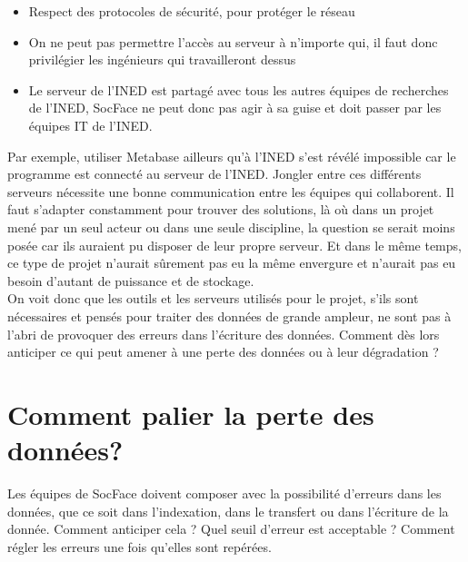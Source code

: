 \begin{itemize}
    \item Respect des protocoles de sécurité, pour protéger le réseau
    \item On ne peut pas permettre l’accès au serveur à n’importe qui, il faut donc privilégier les ingénieurs qui travailleront dessus
    \item Le serveur de l’INED est partagé avec tous les autres équipes de recherches de l’INED, SocFace ne peut donc pas agir à sa guise et doit passer par les équipes IT de l’INED.
\end{itemize}

Par exemple, utiliser Metabase ailleurs qu’à l’INED s’est révélé impossible car le programme est connecté au serveur de l’INED. Jongler entre ces différents serveurs nécessite une bonne communication entre les équipes qui collaborent. Il faut s’adapter constamment pour trouver des solutions, là où dans un projet mené par un seul acteur ou dans une seule discipline, la question se serait moins posée car ils auraient pu disposer de leur propre serveur. Et dans le même temps, ce type de projet n’aurait sûrement pas eu la même envergure et n’aurait pas eu besoin d’autant de puissance et de stockage. \\
On voit donc que les outils et les serveurs utilisés pour le projet, s’ils sont nécessaires et pensés pour traiter des données de grande ampleur, ne sont pas à l’abri de provoquer des erreurs dans l’écriture des données. Comment dès lors anticiper ce qui peut amener à une perte des données ou à leur dégradation ?


    \section{Comment palier la perte des données?}

Les équipes de SocFace doivent composer avec la possibilité d’erreurs dans les données, que ce soit dans l’indexation, dans le transfert ou dans l’écriture de la donnée. Comment anticiper cela ? Quel seuil d’erreur est acceptable ? Comment régler les erreurs une fois qu’elles sont repérées.\\ 

